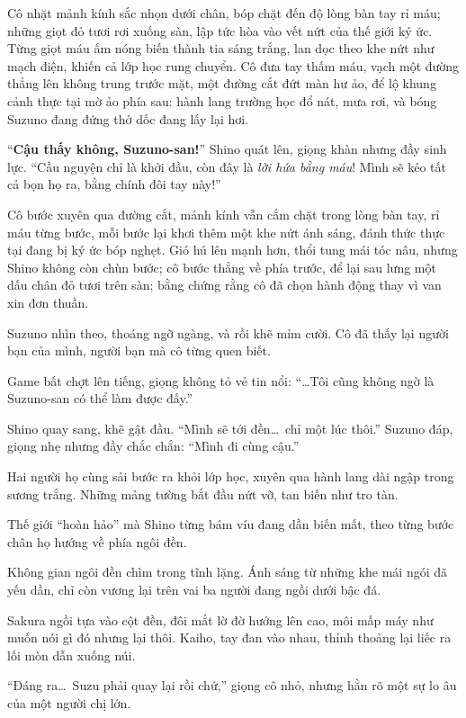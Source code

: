 \documentclass[../main.tex]{subfiles}
\begin{document}
Cô nhặt mảnh kính sắc nhọn dưới chân, bóp chặt đến độ lòng bàn tay rỉ máu; những giọt đỏ tươi rơi xuống sàn, lập tức hòa vào vết nứt của thế giới ký ức. Từng giọt máu ấm nóng biến thành tia sáng trắng, lan dọc theo khe nứt như mạch điện, khiến cả lớp học rung chuyển. Cô đưa tay thấm máu, vạch một đường thẳng lên không trung trước mặt, một đường cắt đứt màn hư ảo, để lộ khung cảnh thực tại mờ ảo phía sau: hành lang trường học đổ nát, mưa rơi, và bóng Suzuno đang đứng thở dốc đang lấy lại hơi.

``\textbf{Cậu thấy không, Suzuno-san!}'' Shino quát lên, giọng khàn nhưng đầy sinh lực. ``Cầu nguyện chỉ là khởi đầu, còn đây là \emph{lời hứa bằng máu}! Mình sẽ kéo tất cả bọn họ ra, bằng chính đôi tay này!''

Cô bước xuyên qua đường cắt, mảnh kính vẫn cắm chặt trong lòng bàn tay, rỉ máu từng bước, mỗi bước lại khơi thêm một khe nứt ánh sáng, đánh thức thực tại đang bị ký ức bóp nghẹt. Gió hú lên mạnh hơn, thổi tung mái tóc nâu, nhưng Shino không còn chùn bước; cô bước thẳng về phía trước, để lại sau lưng một dấu chân đỏ tươi trên sàn; bằng chứng rằng cô đã chọn hành động thay vì van xin đơn thuần.

Suzuno nhìn theo, thoáng ngỡ ngàng, và rồi khẽ mỉm cười. Cô đã thấy lại người bạn của mình, người bạn mà cô từng quen biết.

Game bất chợt lên tiếng, giọng không tỏ vẻ tin nổi: ``\dots Tôi cũng không ngờ là Suzuno-san có thể làm được đấy.''

Shino quay sang, khẽ gật đầu. ``Mình sẽ tới đền\dots\ chỉ một lúc thôi.'' Suzuno đáp, giọng nhẹ nhưng đầy chắc chắn: ``Mình đi cùng cậu.''

Hai người họ cùng sải bước ra khỏi lớp học, xuyên qua hành lang dài ngập trong sương trắng. Những mảng tường bắt đầu nứt vỡ, tan biến như tro tàn.

Thế giới ``hoàn hảo'' mà Shino từng bám víu đang dần biến mất, theo từng bước chân họ hướng về phía ngôi đền.

\ct

Không gian ngôi đền chìm trong tĩnh lặng. Ánh sáng từ những khe mái ngói đã yếu dần, chỉ còn vương lại trên vai ba người đang ngồi dưới bậc đá.

Sakura ngồi tựa vào cột đền, đôi mắt lờ đờ hướng lên cao, môi mấp máy như muốn nói gì đó nhưng lại thôi. Kaiho, tay đan vào nhau, thỉnh thoảng lại liếc ra lối mòn dẫn xuống núi.

``Đáng ra\dots\ Suzu phải quay lại rồi chứ,'' giọng cô nhỏ, nhưng hằn rõ một sự lo âu của một người chị lớn.
\end{document}

